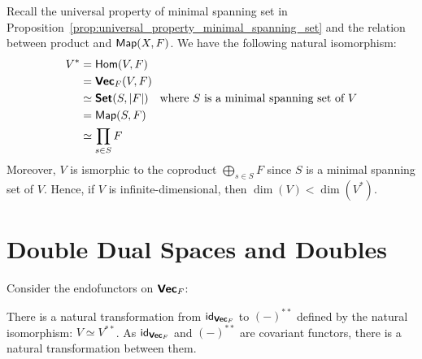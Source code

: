 \begin{center}
  \qquad\qquad
\end{center}

Recall the universal property of minimal spanning set in Proposition~\ref{prop:universal_property_minimal_spanning_set} and the relation between product and $\operatorname{\text{\normalfont\sffamily Map}}(X, F)$. We have the following natural isomorphism:
\begin{align*}
  V^* & = \operatorname{\text{\normalfont\sffamily Hom}}(V, F)                                                                \\
      & = \operatorname{\text{\normalfont\bf\sffamily Vec}}_F(V, F)                                                             \\
      & \simeq \operatorname{\text{\normalfont\bf\sffamily Set}}(S, |F|) \quad \text{where $S$ is a minimal spanning set of $V$} \\
      & = \operatorname{\text{\normalfont\sffamily Map}}(S, F)                                                                \\
      & \simeq \prod_{s \in S} F
\end{align*}
Moreover, $V$ is ismorphic to the coproduct $\bigoplus_{s \in S} F$ since $S$ is a minimal spanning set of $V$. Hence, if $V$ is infinite-dimensional, then $\dim(V) < \dim(V^*)$.

\section{Double Dual Spaces and Doubles}

Consider the endofunctors on $\operatorname{\text{\normalfont\bf\sffamily Vec}}_F$:
\begin{center}
\end{center}
There is a natural transformation from $\operatorname{\text{\normalfont\sffamily id}}_{\operatorname{\text{\normalfont\bf\sffamily Vec}}_F}$ to ${(-)}^{**}$ defined by the natural isomorphism: $V \simeq V^{**}$. As $\operatorname{\text{\normalfont\sffamily id}}_{\operatorname{\text{\normalfont\bf\sffamily Vec}}_F}$ and ${(-)}^{**}$ are covariant functors, there is a natural transformation between them.


